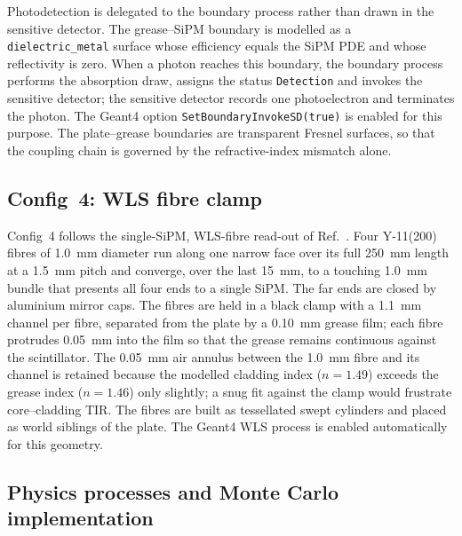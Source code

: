 \documentclass[3p]{elsarticle}
\newcommand{\gfour}{Geant4}
\newcommand{\sipm}{SiPM}
\begin{document}
Photodetection is delegated to the boundary process rather than drawn in the
sensitive detector. The grease--\sipm{} boundary is modelled as a
\texttt{dielectric\_metal} surface whose efficiency equals the \sipm{} PDE and
whose reflectivity is zero. When a photon reaches this boundary, the boundary
process performs the absorption draw, assigns the status \texttt{Detection} and
invokes the sensitive detector; the sensitive detector records one
photoelectron and terminates the photon. The \gfour{} option
\texttt{SetBoundaryInvokeSD(true)} is enabled for this purpose. The
plate--grease boundaries are transparent Fresnel surfaces, so that the coupling
chain is governed by the refractive-index mismatch alone.

\subsection{Config~4: WLS fibre clamp}
\label{sec:wls}

Config~4 follows the single-\sipm{}, WLS-fibre read-out of
Ref.~\cite{Rao2025}. Four Y-11(200) fibres of \SI{1.0}{\milli\meter} diameter
run along one narrow face over its full \SI{250}{\milli\meter} length at a
\SI{1.5}{\milli\meter} pitch and converge, over the last
\SI{15}{\milli\meter}, to a touching \SI{1.0}{\milli\meter} bundle that
presents all four ends to a single \sipm{}. The far ends are closed by
aluminium mirror caps. The fibres are held in a black clamp with a
\SI{1.1}{\milli\meter} channel per fibre, separated from the plate by a
\SI{0.10}{\milli\meter} grease film; each fibre protrudes
\SI{0.05}{\milli\meter} into the film so that the grease remains continuous
against the scintillator. The \SI{0.05}{\milli\meter} air annulus between the
\SI{1.0}{\milli\meter} fibre and its channel is retained because the modelled
cladding index ($n=1.49$) exceeds the grease index ($n=1.46$) only slightly; a
snug fit against the clamp would frustrate core--cladding TIR. The fibres are
built as tessellated swept cylinders and placed as world siblings of the plate.
The \gfour{} WLS process is enabled automatically for this geometry.

\subsection{Physics processes and Monte Carlo implementation}
\label{sec:physics}
\end{document}
